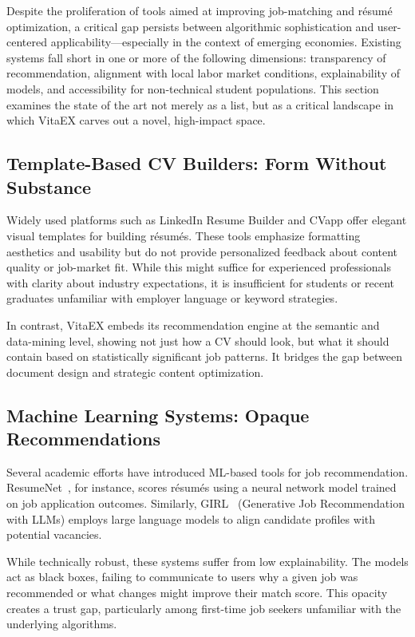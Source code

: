 \documentclass{svproc} %
\begin{document}
	Despite the proliferation of tools aimed at improving job-matching and résumé optimization, a critical gap persists between algorithmic sophistication and user-centered applicability—especially in the context of emerging economies. Existing systems fall short in one or more of the following dimensions: transparency of recommendation, alignment with local labor market conditions, explainability of models, and accessibility for non-technical student populations. This section examines the state of the art not merely as a list, but as a critical landscape in which VitaEX carves out a novel, high-impact space.
	
	\subsection{Template-Based CV Builders: Form Without Substance}
	
	Widely used platforms such as LinkedIn Resume Builder and CVapp offer elegant visual templates for building résumés. These tools emphasize formatting aesthetics and usability but do not provide personalized feedback about content quality or job-market fit. While this might suffice for experienced professionals with clarity about industry expectations, it is insufficient for students or recent graduates unfamiliar with employer language or keyword strategies.
	
	In contrast, VitaEX embeds its recommendation engine at the semantic and data-mining level, showing not just how a CV should look, but what it should contain based on statistically significant job patterns. It bridges the gap between document design and strategic content optimization.
	
	\subsection{Machine Learning Systems: Opaque Recommendations}
	
	Several academic efforts have introduced ML-based tools for job recommendation. ResumeNet~\cite{estadoarte3}, for instance, scores résumés using a neural network model trained on job application outcomes. Similarly, GIRL~\cite{estadoarte2} (Generative Job Recommendation with LLMs) employs large language models to align candidate profiles with potential vacancies.
	
	While technically robust, these systems suffer from low explainability. The models act as black boxes, failing to communicate to users why a given job was recommended or what changes might improve their match score. This opacity creates a trust gap, particularly among first-time job seekers unfamiliar with the underlying algorithms.
	
\end{document}
